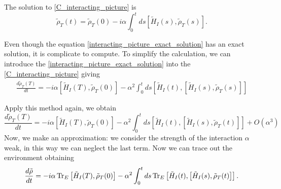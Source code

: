The solution to \eqref{C_interacting_picture} is 
\begin{equation}\label{interacting_picture_exact_solution}
    \tilde\rho_T(t) = \tilde\rho_T(0) -i\alpha\int_{0}^{t}ds\left[\tilde H_I(s),\tilde\rho_T(s)\right].
\end{equation}

Even though the equation \eqref{interacting_picture_exact_solution} has an exact solution, it is complicate to compute. To simplify the calculation, we can introduce the \eqref{interacting_picture_exact_solution} into the \eqref{C_interacting_picture} giving
\begin{eqnarray}
    \frac{d\tilde\rho_T(T)}{dt}= -i\alpha\left[\tilde H_I(T),\tilde\rho_T(0)\right] -\alpha^2 \int_{0}^{t}ds\left[\tilde H_I(t),\left[\tilde H_I(s),\tilde\rho_T(s)\right]\right]
\end{eqnarray}

Apply this method again, we obtain
\begin{equation}
    \frac{d\tilde\rho_T(T)}{dt}= -i\alpha\left[\tilde H_I(T),\tilde\rho_T(0)\right] -\alpha^2 \int_{0}^{t}ds\left[\tilde H_I(t),\left[\tilde H_I(s),\tilde\rho_T(t)\right]\right] + O(\alpha^3)
\end{equation}
Now, we make an approximation: we consider the strength of the interaction $\alpha$ weak, in this way we can neglect the last term.
Now we can trace out the environment obtaining
\begin{equation}\label{trace_C_interacting_picture}
    \frac{d\tilde\rho}{dt} = -i\alpha\operatorname{Tr}_E\left[\tilde H_I(T),\tilde\rho_T(0)\right] -\alpha^2 \int_{0}^{t}ds \operatorname{Tr}_E\left[\tilde H_I(t),\left[\tilde H_I(s),\tilde\rho_T(t)\right]\right].
\end{equation}

